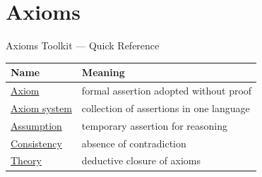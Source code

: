 \section{Axioms}

\begin{toolkitbox}{Axioms Toolkit --- Quick Reference}
\small
\begin{tabular}{l l}
\toprule
\textbf{Name}  & \textbf{Meaning} \\
\midrule
\hyperref[def:axiom]{Axiom}  & formal assertion adopted without proof \\
\hyperref[def:axiom-system]{Axiom system}  & collection of assertions in one language \\
\hyperref[def:assumption]{Assumption}  & temporary assertion for reasoning \\
\hyperref[def:axiom-systems-consistent-axiom-system]{Consistency} & absence of contradiction \\
\hyperref[def:axiom-systems-theory]{Theory} & deductive closure of axioms \\
\bottomrule
\end{tabular}
\end{toolkitbox}


